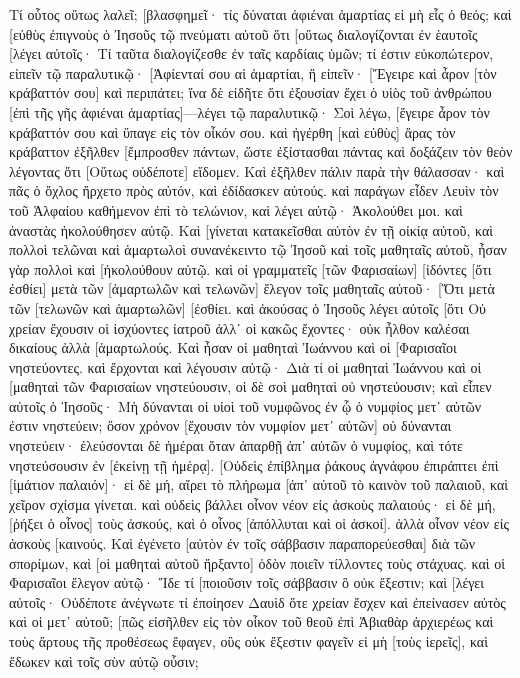 Τί οὗτος οὕτως λαλεῖ; [βλασφημεῖ· τίς δύναται ἀφιέναι ἁμαρτίας εἰ μὴ εἷς ὁ θεός; 
καὶ [εὐθὺς ἐπιγνοὺς ὁ Ἰησοῦς τῷ πνεύματι αὐτοῦ ὅτι [οὕτως διαλογίζονται ἐν ἑαυτοῖς [λέγει αὐτοῖς· Τί ταῦτα διαλογίζεσθε ἐν ταῖς καρδίαις ὑμῶν; 
τί ἐστιν εὐκοπώτερον, εἰπεῖν τῷ παραλυτικῷ· [Ἀφίενταί σου αἱ ἁμαρτίαι, ἢ εἰπεῖν· [Ἔγειρε καὶ ἆρον [τὸν κράβαττόν σου] καὶ περιπάτει; 
ἵνα δὲ εἰδῆτε ὅτι ἐξουσίαν ἔχει ὁ υἱὸς τοῦ ἀνθρώπου [ἐπὶ τῆς γῆς ἀφιέναι ἁμαρτίας]—λέγει τῷ παραλυτικῷ· 
Σοὶ λέγω, [ἔγειρε ἆρον τὸν κράβαττόν σου καὶ ὕπαγε εἰς τὸν οἶκόν σου. 
καὶ ἠγέρθη [καὶ εὐθὺς] ἄρας τὸν κράβαττον ἐξῆλθεν [ἔμπροσθεν πάντων, ὥστε ἐξίστασθαι πάντας καὶ δοξάζειν τὸν θεὸν λέγοντας ὅτι [Οὕτως οὐδέποτε] εἴδομεν. 
Καὶ ἐξῆλθεν πάλιν παρὰ τὴν θάλασσαν· καὶ πᾶς ὁ ὄχλος ἤρχετο πρὸς αὐτόν, καὶ ἐδίδασκεν αὐτούς. 
καὶ παράγων εἶδεν Λευὶν τὸν τοῦ Ἁλφαίου καθήμενον ἐπὶ τὸ τελώνιον, καὶ λέγει αὐτῷ· Ἀκολούθει μοι. καὶ ἀναστὰς ἠκολούθησεν αὐτῷ. 
Καὶ [γίνεται κατακεῖσθαι αὐτὸν ἐν τῇ οἰκίᾳ αὐτοῦ, καὶ πολλοὶ τελῶναι καὶ ἁμαρτωλοὶ συνανέκειντο τῷ Ἰησοῦ καὶ τοῖς μαθηταῖς αὐτοῦ, ἦσαν γὰρ πολλοὶ καὶ [ἠκολούθουν αὐτῷ. 
καὶ οἱ γραμματεῖς [τῶν Φαρισαίων] [ἰδόντες [ὅτι ἐσθίει] μετὰ τῶν [ἁμαρτωλῶν καὶ τελωνῶν] ἔλεγον τοῖς μαθηταῖς αὐτοῦ· [Ὅτι μετὰ τῶν [τελωνῶν καὶ ἁμαρτωλῶν] [ἐσθίει. 
καὶ ἀκούσας ὁ Ἰησοῦς λέγει αὐτοῖς [ὅτι Οὐ χρείαν ἔχουσιν οἱ ἰσχύοντες ἰατροῦ ἀλλ᾽ οἱ κακῶς ἔχοντες· οὐκ ἦλθον καλέσαι δικαίους ἀλλὰ [ἁμαρτωλούς. 
Καὶ ἦσαν οἱ μαθηταὶ Ἰωάννου καὶ οἱ [Φαρισαῖοι νηστεύοντες. καὶ ἔρχονται καὶ λέγουσιν αὐτῷ· Διὰ τί οἱ μαθηταὶ Ἰωάννου καὶ οἱ [μαθηταὶ τῶν Φαρισαίων νηστεύουσιν, οἱ δὲ σοὶ μαθηταὶ οὐ νηστεύουσιν; 
καὶ εἶπεν αὐτοῖς ὁ Ἰησοῦς· Μὴ δύνανται οἱ υἱοὶ τοῦ νυμφῶνος ἐν ᾧ ὁ νυμφίος μετ᾽ αὐτῶν ἐστιν νηστεύειν; ὅσον χρόνον [ἔχουσιν τὸν νυμφίον μετ᾽ αὐτῶν] οὐ δύνανται νηστεύειν· 
ἐλεύσονται δὲ ἡμέραι ὅταν ἀπαρθῇ ἀπ᾽ αὐτῶν ὁ νυμφίος, καὶ τότε νηστεύσουσιν ἐν [ἐκείνῃ τῇ ἡμέρᾳ]. 
[Οὐδεὶς ἐπίβλημα ῥάκους ἀγνάφου ἐπιράπτει ἐπὶ [ἱμάτιον παλαιόν]· εἰ δὲ μή, αἴρει τὸ πλήρωμα [ἀπ᾽ αὐτοῦ τὸ καινὸν τοῦ παλαιοῦ, καὶ χεῖρον σχίσμα γίνεται. 
καὶ οὐδεὶς βάλλει οἶνον νέον εἰς ἀσκοὺς παλαιούς· εἰ δὲ μή, [ῥήξει ὁ οἶνος] τοὺς ἀσκούς, καὶ ὁ οἶνος [ἀπόλλυται καὶ οἱ ἀσκοί]. ἀλλὰ οἶνον νέον εἰς ἀσκοὺς [καινούς. 
Καὶ ἐγένετο [αὐτὸν ἐν τοῖς σάββασιν παραπορεύεσθαι] διὰ τῶν σπορίμων, καὶ [οἱ μαθηταὶ αὐτοῦ ἤρξαντο] ὁδὸν ποιεῖν τίλλοντες τοὺς στάχυας. 
καὶ οἱ Φαρισαῖοι ἔλεγον αὐτῷ· Ἴδε τί [ποιοῦσιν τοῖς σάββασιν ὃ οὐκ ἔξεστιν; 
καὶ [λέγει αὐτοῖς· Οὐδέποτε ἀνέγνωτε τί ἐποίησεν Δαυὶδ ὅτε χρείαν ἔσχεν καὶ ἐπείνασεν αὐτὸς καὶ οἱ μετ᾽ αὐτοῦ; 
[πῶς εἰσῆλθεν εἰς τὸν οἶκον τοῦ θεοῦ ἐπὶ Ἀβιαθὰρ ἀρχιερέως καὶ τοὺς ἄρτους τῆς προθέσεως ἔφαγεν, οὓς οὐκ ἔξεστιν φαγεῖν εἰ μὴ [τοὺς ἱερεῖς], καὶ ἔδωκεν καὶ τοῖς σὺν αὐτῷ οὖσιν; 
